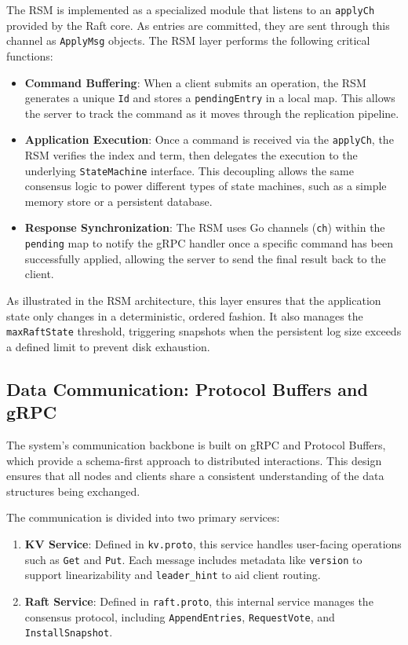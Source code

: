 The RSM is implemented as a specialized module that listens to an \texttt{applyCh} provided by the Raft core. As entries are committed, they are sent through this channel as \texttt{ApplyMsg} objects. The RSM layer performs the following critical functions:
\begin{itemize}
    \item \textbf{Command Buffering}: When a client submits an operation, the RSM generates a unique \texttt{Id} and stores a \texttt{pendingEntry} in a local map. This allows the server to track the command as it moves through the replication pipeline.
    \item \textbf{Application Execution}: Once a command is received via the \texttt{applyCh}, the RSM verifies the index and term, then delegates the execution to the underlying \texttt{StateMachine} interface. This decoupling allows the same consensus logic to power different types of state machines, such as a simple memory store or a persistent database.
    \item \textbf{Response Synchronization}: The RSM uses Go channels (\texttt{ch}) within the \texttt{pending} map to notify the gRPC handler once a specific command has been successfully applied, allowing the server to send the final result back to the client.
\end{itemize}


As illustrated in the RSM architecture, this layer ensures that the application state only changes in a deterministic, ordered fashion. It also manages the \texttt{maxRaftState} threshold, triggering snapshots when the persistent log size exceeds a defined limit to prevent disk exhaustion.

\subsection{Data Communication: Protocol Buffers and gRPC}
The system's communication backbone is built on gRPC and Protocol Buffers, which provide a schema-first approach to distributed interactions. This design ensures that all nodes and clients share a consistent understanding of the data structures being exchanged.

The communication is divided into two primary services:
\begin{enumerate}
    \item \textbf{KV Service}: Defined in \texttt{kv.proto}, this service handles user-facing operations such as \texttt{Get} and \texttt{Put}. Each message includes metadata like \texttt{version} to support linearizability and \texttt{leader\_hint} to aid client routing.
    \item \textbf{Raft Service}: Defined in \texttt{raft.proto}, this internal service manages the consensus protocol, including \texttt{AppendEntries}, \texttt{RequestVote}, and \texttt{InstallSnapshot}.
\end{enumerate}

